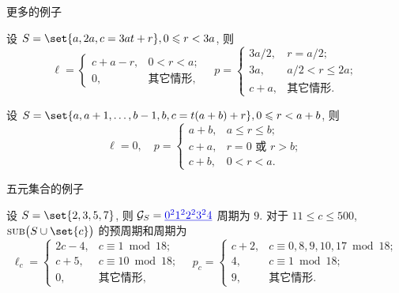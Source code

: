 \documentclass[aspectratio=169]{ctexbeamer}
\DeclareMathOperator*{\SUB}{{\text{\mdseries{\upshape\textsc{sub}}}}}
\renewcommand\ul[1]{{\color{main}\underline{#1}}}
\begin{document}
\begin{frame}{更多的例子}
  \onslide<+->
  \begin{proposition}
    设 $S=\set{a,2a,c=3at+r},0\le r<3a$, 则
    \[
      \ell=\begin{cases}
        c+a-r,&0<r<a;\\
        0,&\text{其它情形},
      \end{cases}\quad 
      p=\begin{cases}
        3a/2,&r=a/2;\\
        3a,&a/2<r\le 2a;\\
        c+a,&\text{其它情形.}
      \end{cases}
    \]
  \end{proposition}
  \onslide<+->
  \begin{proposition}
    设 $S=\set{a,a+1,\dots,b-1,b,c=t(a+b)+r},0\le r<a+b$, 则
    \[\ell=0,\quad p=\begin{cases}
      a+b,&a\le r\le b;\\
      c+a,&r=0\text{ 或 }r>b;\\
      c+b,&0<r<a.
    \end{cases}\]
  \end{proposition}
\end{frame}


\begin{frame}{五元集合的例子}
  \onslide<+->
  \begin{example}
    设 $S=\set{2,3,5,7}$, 则 $\CG_S=\ul{0^2 1^2 2^2 3^2 4}$ 周期为 $9$.
    对于 $11\le c\le 500$, $\SUB\bigl(S\cup\set{c}\bigr)$ 的预周期和周期为
    \[\ell_c=\begin{cases}
      2c-4,&c\equiv1\bmod{18};\\
      c+5,&c\equiv10\bmod{18};\\
      0,&\text{其它情形},
    \end{cases}\quad
      p_c=\begin{cases}
      c+2, &c\equiv0,8,9,10,17\bmod{18};\\
      4, &c\equiv1\bmod{18};\\
      9, &\text{其它情形}.
    \end{cases}\]
  \end{example}
\end{frame}
\end{document}
